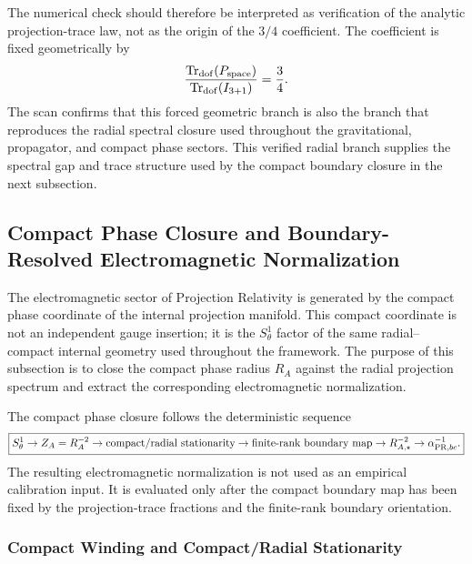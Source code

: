 \documentclass[11pt]{article}
\begin{document}
The numerical check should therefore be interpreted as verification of the analytic projection-trace law, not as the origin of the \(3/4\) coefficient. The coefficient is fixed geometrically by
\begin{equation}
\frac{
\operatorname{Tr}_{\rm dof}(P_{\rm space})
}{
\operatorname{Tr}_{\rm dof}(I_{3+1})
}
=
\frac{3}{4}.
\end{equation}
The scan confirms that this forced geometric branch is also the branch that reproduces the radial spectral closure used throughout the gravitational, propagator, and compact phase sectors. This verified radial branch supplies the spectral gap and trace structure used by the compact boundary closure in the next subsection.

\subsection{Compact Phase Closure and Boundary-Resolved Electromagnetic Normalization}
\label{sec:compact_phase_closure_alpha}

The electromagnetic sector of Projection Relativity is generated by the compact
phase coordinate of the internal projection manifold. This compact coordinate is
not an independent gauge insertion; it is the \(S^1_\theta\) factor of the same
radial--compact internal geometry used throughout the framework. The purpose of
this subsection is to close the compact phase radius \(R_A\) against the radial
projection spectrum and extract the corresponding electromagnetic normalization.

The compact phase closure follows the deterministic sequence
\begin{equation}
\boxed{
S^1_\theta
\rightarrow
Z_A=R_A^{-2}
\rightarrow
\text{compact/radial stationarity}
\rightarrow
\text{finite-rank boundary map}
\rightarrow
R_{A,\star}^{-2}
\rightarrow
\alpha_{{\rm PR},bc}^{-1}.
}
\end{equation}
The resulting electromagnetic normalization is not used as an empirical
calibration input. It is evaluated only after the compact boundary map has been
fixed by the projection-trace fractions and the finite-rank boundary orientation.

\subsubsection{Compact Winding and Compact/Radial Stationarity}
\label{sec:compact_winding_stationarity}
\end{document}
